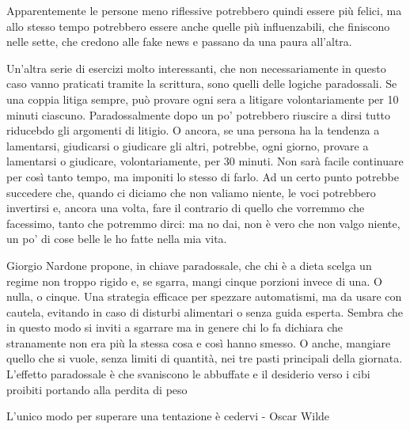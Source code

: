 \documentclass[12pt]{book} %
\begin{document}
Apparentemente le persone meno riflessive potrebbero quindi essere più felici, ma allo stesso tempo potrebbero essere anche quelle più influenzabili, che finiscono nelle sette, che credono alle fake news e passano da una paura all'altra.

\begin{mdframed}[linewidth=1pt]
Un'altra serie di esercizi molto interessanti, che non necessariamente in questo caso vanno
praticati tramite la scrittura, sono quelli delle logiche paradossali. Se una coppia litiga sempre, può provare ogni sera a litigare volontariamente per 10 minuti ciascuno.
Paradossalmente dopo un po' potrebbero riuscire a dirsi tutto riducebdo gli argomenti di litigio. O ancora, se una
persona ha la tendenza a lamentarsi, giudicarsi o giudicare gli altri, potrebbe, ogni giorno, provare a lamentarsi o
giudicare, volontariamente, per 30 minuti. Non sarà facile continuare per così tanto tempo, ma imponiti lo stesso di
farlo. Ad un certo punto potrebbe succedere che, quando ci diciamo che non valiamo niente, le voci potrebbero invertirsi e, ancora una volta, fare il contrario di quello che vorremmo che facessimo, tanto che potremmo dirci: ma no dai, non è vero che non valgo niente, un po' di cose belle le ho fatte nella mia vita.

Giorgio Nardone propone, in chiave paradossale, che chi è a dieta scelga un regime non troppo rigido e, se sgarra, mangi cinque porzioni invece di una. O nulla, o cinque. Una strategia efficace per spezzare automatismi, ma da usare con cautela, evitando in caso di disturbi alimentari o senza guida esperta. Sembra che in questo modo si inviti a sgarrare ma in genere chi lo fa
dichiara che stranamente non era più la stessa cosa e così hanno smesso. O anche, mangiare quello che si vuole, senza
limiti di quantità, nei tre pasti principali della giornata. L'effetto paradossale è che
svaniscono le abbuffate e il desiderio verso i cibi proibiti portando alla perdita di peso

L'unico modo per superare una tentazione è cedervi - Oscar Wilde


\end{mdframed}
\end{document}

